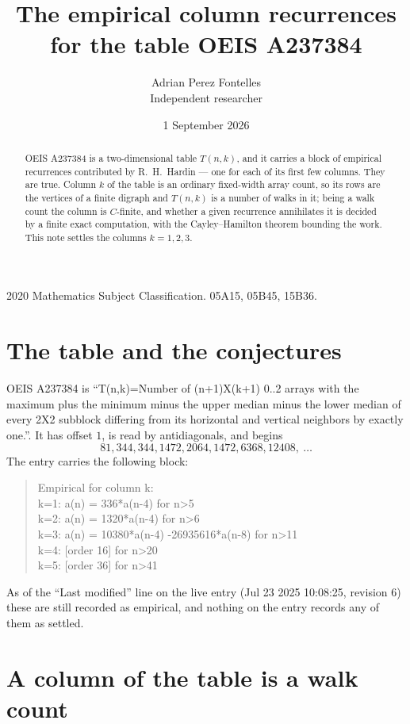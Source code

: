 \documentclass[11pt,a4paper]{article}
\title{The empirical column recurrences for the table OEIS A237384}
\author{Adrian Perez Fontelles\\ \small Independent researcher}
\date{1 September 2026}
\theoremstyle{plain}
\theoremstyle{definition}
\begin{document}
\maketitle

\begin{abstract}
OEIS A237384 is a two-dimensional table $T(n,k)$, and it carries a block of empirical
recurrences contributed by R.~H.~Hardin --- one for each of its first few columns. They are
true. Column $k$ of the table is an ordinary fixed-width array count, so its rows are the
vertices of a finite digraph and $T(n,k)$ is a number of walks in it; being a walk count the
column is $C$-finite, and whether a given recurrence annihilates it is decided by a finite
exact computation, with the Cayley--Hamilton theorem bounding the work. This note settles the columns $k=1, 2, 3$.
\end{abstract}

\noindent\small 2020 Mathematics Subject Classification. 05A15, 05B45, 15B36.\normalsize

\section{The table and the conjectures}

OEIS A237384 is ``T(n,k)=Number of (n+1)X(k+1) 0..2 arrays with the maximum plus the minimum minus the upper median minus the lower median of every 2X2 subblock differing from its horizontal and vertical neighbors by exactly one.''. It has offset $1$, is
read by antidiagonals, and begins
\[
81, 344, 344, 1472, 2064, 1472, 6368, 12408,\ \dots
\]
The entry carries the following block:
\begin{quote}\small
Empirical for column k:\\
k=1: a(n) = 336*a(n-4) for n>5\\
k=2: a(n) = 1320*a(n-4) for n>6\\
k=3: a(n) = 10380*a(n-4) -26935616*a(n-8) for n>11\\
k=4: [order 16] for n>20\\
k=5: [order 36] for n>41\\
\end{quote}
As of the ``Last modified'' line on the live entry (Jul 23 2025 10:08:25, revision 6) these are still
recorded as empirical, and nothing on the entry records any of them as settled.

\section{A column of the table is a walk count}
\end{document}
